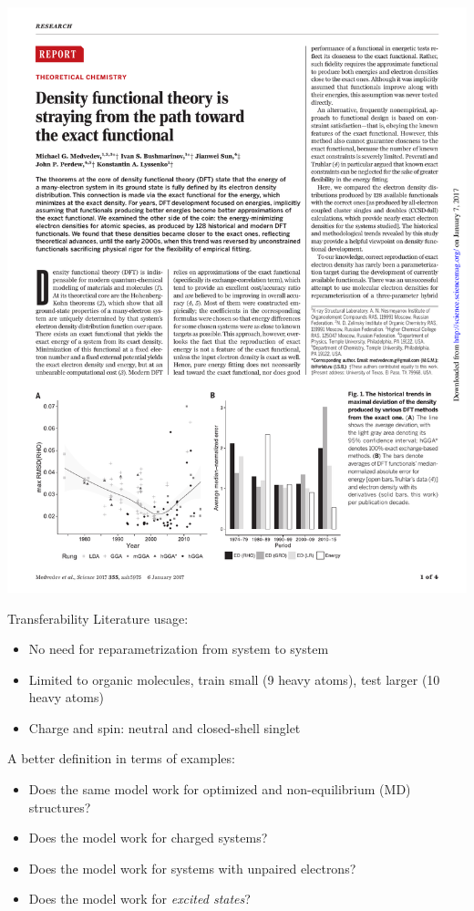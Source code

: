 \documentclass[xetex,compress]{beamer}
\begin{document}
\begin{frame}{}
  \begin{center}
    \includegraphics[width=1.00\textwidth]{./figures/obit2.pdf}
  \end{center}
\end{frame}

\begin{frame}{Transferability}
  Literature usage:
  \begin{itemize}
  \item No need for reparametrization from system to system
  \item Limited to organic molecules, train small (9 heavy atoms), test larger (10 heavy atoms)
  \item Charge and spin: neutral and closed-shell singlet
  \end{itemize}
  A better definition in terms of examples:
  \begin{itemize}
  \item Does the same model work for optimized and non-equilibrium (MD) structures?
  \item Does the model work for charged systems?
  \item Does the model work for systems with unpaired electrons?
  \item Does the model work for \textit{excited states}?
  \end{itemize}
\end{frame}
\end{document}
